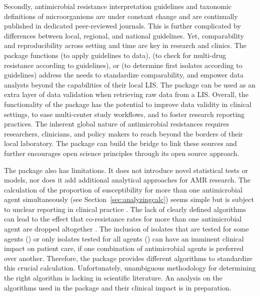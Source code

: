 \documentclass[article, shortnames]{jss}
\newcommand{\fct}[1]{\code{#1()}}
\begin{document}
Secondly, antimicrobial resistance interpretation guidelines
\citep{Leclercq2013-ml, Clinical_and_Laboratory_Standards_Institute2014-fb}
and taxonomic definitions of microorganisms are under constant change and
are continually published in dedicated peer-reviewed journals.  This is
further complicated by differences between local, regional, and national
guidelines.  Yet, comparability and reproducibility across setting and time
are key in research and clinics.  The  package functions
\fct{eucast\_rules} (to apply guidelines to data), \fct{mdro} (to check for
multi-drug resistance according to guidelines), or \fct{first\_isolate} (to
determine first isolates according to guidelines) address the needs to
standardize comparability, and empower data analysts beyond the capabilities
of their local LIS.  The  package can be used as an extra layer of
data validation when retrieving raw data from a LIS.  Overall, the
functionality of the  package has the potential to improve data
validity in clinical settings, to ease multi-center study workflows, and to
foster research reporting practices.  The inherent global nature of
antimicrobial resistances requires researchers, clinicians, and policy
makers to reach beyond the borders of their local laboratory.  The 
package can build the bridge to link these sources and further encourages
open science principles through its open source approach.

The  package also has limitations.  It does not introduce novel
statistical tests or models, nor does it add additional analytical
approaches for AMR research.  The calculation of the proportion of
susceptibility for more than one antimicrobial agent simultaneously (see
Section~\ref{sec:analyzingcalc}) seems simple but is subject to unclear
reporting in clinical practice \citep{Schechner2013, Ma2017}.  The lack of
clearly defined algorithms can lead to the effect that co-resistance rates
for more than one antimicrobial agent are dropped altogether
\citep{Baur2017}.  The inclusion of isolates that are tested for some agents
() or only isolates tested for all agents
() can have an imminent clinical impact on
patient care, if one combination of antimicrobial agents is preferred over
another.  Therefore, the  package provides different algorithms to
standardize this crucial calculation.  Unfortunately, unambiguous
methodology for determining the right algorithm is lacking in scientific
literature.  An analysis on the algorithms used in the  package and
their clinical impact is in preparation.
\end{document}
